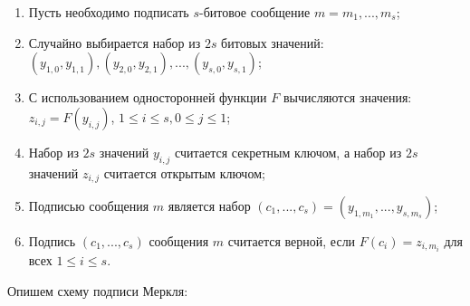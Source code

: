 \documentclass{./civarticle}
\begin{document}
\begin{enumerate}
    \item Пусть необходимо подписать $s$-битовое сообщение $m = m_1, ..., m_s$;
    \item Случайно выбирается набор из $2s$ битовых значений: $(y_{1, 0}, y_{1, 1}), (y_{2, 0}, y_{2, 1}), ..., (y_{s, 0}, y_{s, 1})$;
    \item С использованием односторонней функции $F$ вычисляются значения: $z_{i, j} = F(y_{i, j})$, $1 \leq i \leq s, 0 \leq j \leq 1$;
    \item Набор из $2s$ значений $y_{i, j}$ считается секретным ключом, а набор из $2s$ значений $z_{i, j}$ считается открытым ключом;
    \item Подписью сообщения $m$ является набор $(c_1, ..., c_s) = (y_{1, m_1}, ..., y_{s, m_s})$;
    \item Подпись $(c_1, ..., c_s)$ сообщения $m$ считается верной, если $F(c_i) = z_{i, m_i}$ для всех $1 \leq i \leq s$.
\end{enumerate}

Опишем схему подписи Меркля:
\end{document}
